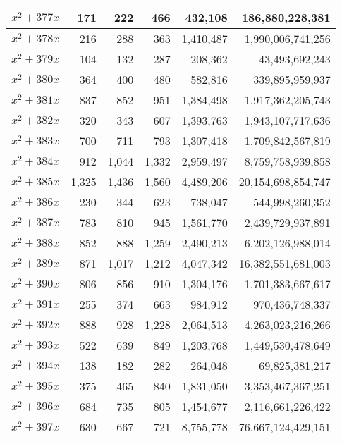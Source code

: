 \documentclass[a4paper]{amsproc}
\theoremstyle{plain}
\theoremstyle{named}
\begin{document}
\begin{longtable}{ | l | r | r | r | r | r | }
$x^2 + 377x$ & 171 & 222 & 466 & 432{,}108 & 186{,}880{,}228{,}381 \\ \hline
$x^2 + 378x$ & 216 & 288 & 363 & 1{,}410{,}487 & 1{,}990{,}006{,}741{,}256 \\ \hline
$x^2 + 379x$ & 104 & 132 & 287 & 208{,}362 & 43{,}493{,}692{,}243 \\ \hline
$x^2 + 380x$ & 364 & 400 & 480 & 582{,}816 & 339{,}895{,}959{,}937 \\ \hline
$x^2 + 381x$ & 837 & 852 & 951 & 1{,}384{,}498 & 1{,}917{,}362{,}205{,}743 \\ \hline
$x^2 + 382x$ & 320 & 343 & 607 & 1{,}393{,}763 & 1{,}943{,}107{,}717{,}636 \\ \hline
$x^2 + 383x$ & 700 & 711 & 793 & 1{,}307{,}418 & 1{,}709{,}842{,}567{,}819 \\ \hline
$x^2 + 384x$ & 912 & 1{,}044 & 1{,}332 & 2{,}959{,}497 & 8{,}759{,}758{,}939{,}858 \\ \hline
$x^2 + 385x$ & 1{,}325 & 1{,}436 & 1{,}560 & 4{,}489{,}206 & 20{,}154{,}698{,}854{,}747 \\ \hline
$x^2 + 386x$ & 230 & 344 & 623 & 738{,}047 & 544{,}998{,}260{,}352 \\ \hline
$x^2 + 387x$ & 783 & 810 & 945 & 1{,}561{,}770 & 2{,}439{,}729{,}937{,}891 \\ \hline
$x^2 + 388x$ & 852 & 888 & 1{,}259 & 2{,}490{,}213 & 6{,}202{,}126{,}988{,}014 \\ \hline
$x^2 + 389x$ & 871 & 1{,}017 & 1{,}212 & 4{,}047{,}342 & 16{,}382{,}551{,}681{,}003 \\ \hline
$x^2 + 390x$ & 806 & 856 & 910 & 1{,}304{,}176 & 1{,}701{,}383{,}667{,}617 \\ \hline
$x^2 + 391x$ & 255 & 374 & 663 & 984{,}912 & 970{,}436{,}748{,}337 \\ \hline
$x^2 + 392x$ & 888 & 928 & 1{,}228 & 2{,}064{,}513 & 4{,}263{,}023{,}216{,}266 \\ \hline
$x^2 + 393x$ & 522 & 639 & 849 & 1{,}203{,}768 & 1{,}449{,}530{,}478{,}649 \\ \hline
$x^2 + 394x$ & 138 & 182 & 282 & 264{,}048 & 69{,}825{,}381{,}217 \\ \hline
$x^2 + 395x$ & 375 & 465 & 840 & 1{,}831{,}050 & 3{,}353{,}467{,}367{,}251 \\ \hline
$x^2 + 396x$ & 684 & 735 & 805 & 1{,}454{,}677 & 2{,}116{,}661{,}226{,}422 \\ \hline
$x^2 + 397x$ & 630 & 667 & 721 & 8{,}755{,}778 & 76{,}667{,}124{,}429{,}151 \\ \hline

\end{longtable}
\end{document}
